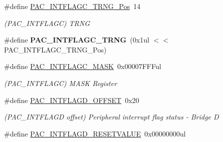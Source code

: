 \begin{DoxyCompactItemize}
\item 
\hypertarget{group___s_a_m_l21___p_a_c_ga22ee6ab690da90cff67b50a87c04ce59}{}\#define \hyperlink{group___s_a_m_l21___p_a_c_ga22ee6ab690da90cff67b50a87c04ce59}{P\+A\+C\+\_\+\+I\+N\+T\+F\+L\+A\+G\+C\+\_\+\+T\+R\+N\+G\+\_\+\+Pos}~14\label{group___s_a_m_l21___p_a_c_ga22ee6ab690da90cff67b50a87c04ce59}

\begin{DoxyCompactList}\small\item\em (P\+A\+C\+\_\+\+I\+N\+T\+F\+L\+A\+G\+C) T\+R\+N\+G \end{DoxyCompactList}\item 
\hypertarget{group___s_a_m_l21___p_a_c_gac38f0b130c9b1c4c9f7b8d08476cfd22}{}\#define {\bfseries P\+A\+C\+\_\+\+I\+N\+T\+F\+L\+A\+G\+C\+\_\+\+T\+R\+N\+G}~(0x1ul $<$$<$ P\+A\+C\+\_\+\+I\+N\+T\+F\+L\+A\+G\+C\+\_\+\+T\+R\+N\+G\+\_\+\+Pos)\label{group___s_a_m_l21___p_a_c_gac38f0b130c9b1c4c9f7b8d08476cfd22}

\item 
\hypertarget{group___s_a_m_l21___p_a_c_ga4cce7e4ad8ae62263da0d09e97638410}{}\#define \hyperlink{group___s_a_m_l21___p_a_c_ga4cce7e4ad8ae62263da0d09e97638410}{P\+A\+C\+\_\+\+I\+N\+T\+F\+L\+A\+G\+C\+\_\+\+M\+A\+S\+K}~0x00007\+F\+F\+Ful\label{group___s_a_m_l21___p_a_c_ga4cce7e4ad8ae62263da0d09e97638410}

\begin{DoxyCompactList}\small\item\em (P\+A\+C\+\_\+\+I\+N\+T\+F\+L\+A\+G\+C) M\+A\+S\+K Register \end{DoxyCompactList}\item 
\hypertarget{group___s_a_m_l21___p_a_c_ga970cb6a03ee41e86ce0fb8a9304f7536}{}\#define \hyperlink{group___s_a_m_l21___p_a_c_ga970cb6a03ee41e86ce0fb8a9304f7536}{P\+A\+C\+\_\+\+I\+N\+T\+F\+L\+A\+G\+D\+\_\+\+O\+F\+F\+S\+E\+T}~0x20\label{group___s_a_m_l21___p_a_c_ga970cb6a03ee41e86ce0fb8a9304f7536}

\begin{DoxyCompactList}\small\item\em (P\+A\+C\+\_\+\+I\+N\+T\+F\+L\+A\+G\+D offset) Peripheral interrupt flag status -\/ Bridge D \end{DoxyCompactList}\item 
\hypertarget{group___s_a_m_l21___p_a_c_ga2f043f534d182198a69716a088028e25}{}\#define \hyperlink{group___s_a_m_l21___p_a_c_ga2f043f534d182198a69716a088028e25}{P\+A\+C\+\_\+\+I\+N\+T\+F\+L\+A\+G\+D\+\_\+\+R\+E\+S\+E\+T\+V\+A\+L\+U\+E}~0x00000000ul\label{group___s_a_m_l21___p_a_c_ga2f043f534d182198a69716a088028e25}


\end{DoxyCompactItemize}
